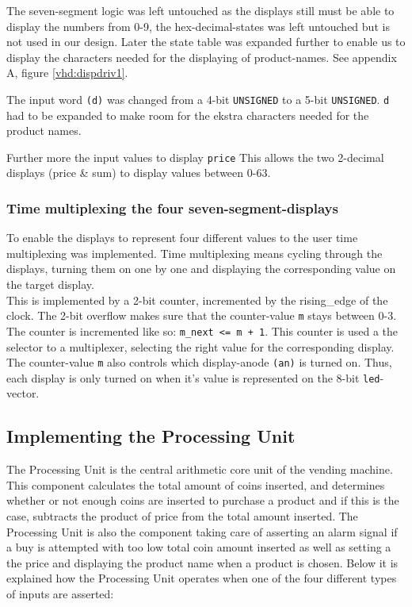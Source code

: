 The seven-segment logic was left untouched as the displays still must be able to display the numbers from 0-9, the hex-decimal-states was left untouched but is not used in our design. Later the state table was expanded further to enable us to display the characters needed for the displaying of product-names. See appendix A, figure \ref{vhd:dispdriv1}.

The input word \texttt{(d)} was changed from a 4-bit \texttt{UNSIGNED} to a 5-bit \texttt{UNSIGNED}. \texttt{d} had to be expanded to make room for the ekstra characters needed for the product names.

Further more the input values to display \texttt{price} 
This allows the two 2-decimal displays (price \& sum) to display values between 0-63.

\subsubsection{Time multiplexing the four seven-segment-displays}
To enable the displays to represent four different values to the user time multiplexing was implemented. Time multiplexing means cycling through the displays, turning them on one by one and displaying the corresponding value on the target display. \\

This is implemented by a 2-bit counter, incremented by the rising\_edge of the clock. The 2-bit overflow makes sure that the counter-value \texttt{m} stays between 0-3. The counter is incremented like so: \texttt{m\_next <= m + 1}. This counter is used a the selector to a multiplexer, selecting the right value for the corresponding display. The counter-value \texttt{m} also controls which display-anode \texttt{(an)} is turned on. Thus, each display is only turned on when it's value is represented on the 8-bit \texttt{led}-vector.

\subsection{Implementing the Processing Unit}

The Processing Unit is the central arithmetic core unit of the vending machine. This component calculates the total amount of coins inserted, and determines whether or not enough coins are inserted to purchase a product and if this is the case, subtracts the product of price from the total amount inserted. The Processing Unit is also the component taking care of asserting an alarm signal if a buy is attempted with too low total coin amount inserted as well as setting a the price and displaying the product name when a product is chosen. Below it is explained how the Processing Unit operates when one of the four different types of inputs are asserted:

